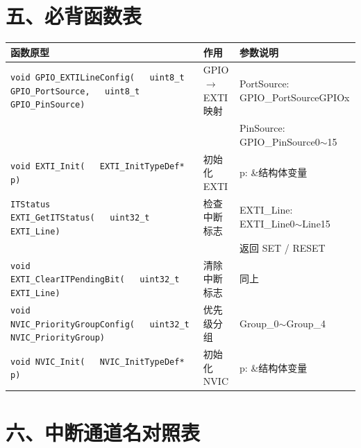 \documentclass[10pt,a4paper,oneside]{ctexart}
\begin{document}
\section*{五、必背函数表}

\begin{center}
\begin{tabular}{@{}p{5.5cm}p{2.2cm}p{3.3cm}@{}}
    \toprule
    \textbf{函数原型} & \textbf{作用} & \textbf{参数说明} \\
    \midrule
    \texttt{void GPIO\_EXTILineConfig(}\newline\texttt{~~~uint8\_t GPIO\_PortSource,}\newline\texttt{~~~uint8\_t GPIO\_PinSource)} & GPIO$\to$EXTI映射 & PortSource: GPIO\_PortSourceGPIOx \\
     &  & PinSource: GPIO\_PinSource0$\sim$15 \\
    \midrule
    \texttt{void EXTI\_Init(}\newline\texttt{~~~EXTI\_InitTypeDef* p)} & 初始化EXTI & p: \&结构体变量 \\
    \midrule
    \texttt{ITStatus EXTI\_GetITStatus(}\newline\texttt{~~~uint32\_t EXTI\_Line)} & 检查中断标志 & EXTI\_Line: EXTI\_Line0$\sim$Line15 \\
     &  & 返回 SET / RESET \\
    \midrule
    \texttt{void EXTI\_ClearITPendingBit(}\newline\texttt{~~~uint32\_t EXTI\_Line)} & 清除中断标志 & 同上 \\
    \midrule
    \texttt{void NVIC\_PriorityGroupConfig(}\newline\texttt{~~~uint32\_t NVIC\_PriorityGroup)} & 优先级分组 & Group\_0$\sim$Group\_4 \\
    \midrule
    \texttt{void NVIC\_Init(}\newline\texttt{~~~NVIC\_InitTypeDef* p)} & 初始化NVIC & p: \&结构体变量 \\
    \bottomrule
\end{tabular}
\end{center}

\section*{六、中断通道名对照表}
\end{document}
